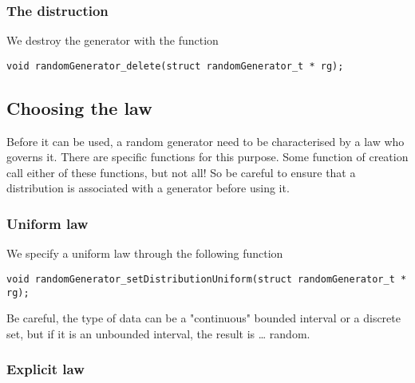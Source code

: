 \subsubsection{The distruction}

   We destroy the generator with the function

\begin{verbatim}
void randomGenerator_delete(struct randomGenerator_t * rg);
\end{verbatim}

%
\subsection{Choosing the law}

   Before it can be used, a random generator need to be characterised
by a law who governs it. There are specific functions for this purpose. 
Some function of creation call either of these functions, but not all! 
So be careful to ensure that a distribution is associated with a generator 
before using it.

%
\subsubsection{Uniform law}

   We specify a uniform law through the following function

\begin{verbatim}
void randomGenerator_setDistributionUniform(struct randomGenerator_t * rg);
\end{verbatim}
   
   Be careful, the type of data can be a "continuous" bounded interval
or a discrete set, but if it is an unbounded interval, the result is
\ldots {} random.

%
\subsubsection{Explicit law}
   
